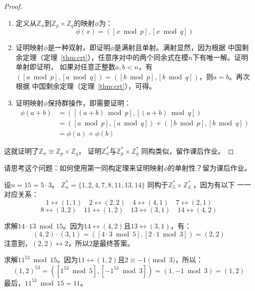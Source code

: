\begin{proof}
\begin{enumerate}
\item 定义从$\mathbb{Z}_n$到$\mathbb{Z}_p \times \mathbb{Z}_q$的映射$\phi$为：
\[\phi(x) = ([x \bmod p], [x \bmod q])\]

\item 证明映射$\phi$是一种双射，即证明$\phi$是满射且单射。满射显然，因为根据
中国剩余定理（定理~\ref{thm:crt}），任意序对中的两个同余式在模$n$下有唯一解。证明单射即证明，
如果对任意正整数$a, b < n$，有
$([a \bmod p], [a \bmod q]) = ([b \bmod p], [b \bmod q])$，则$a = b$。再次根据
中国剩余定理（定理~\ref{thm:crt}），可得。

\item 证明映射$\phi$保持群操作，即需要证明：
\begin{align*}
\phi(a+b) &= ([(a+b) \bmod p], [(a+b)\bmod q]) \\
                     &=  ([a \bmod p], [a \bmod q]) + ([b \bmod p], [b\bmod q])\\
                     &=  \phi(a) + \phi(b)
\end{align*}
\end{enumerate}
这就证明了$\mathbb{Z}_n \cong \mathbb{Z}_p \times \mathbb{Z}_q $，
证明$\mathbb{Z}_n^*$与$\mathbb{Z}_p^* \times \mathbb{Z}_q^*$ 同构类似，留作课后作业。
\end{proof}

\begin{thinking}
请思考这个问题：如何使用第一同构定理来证明映射$\phi$的单射性？留为课后作业。
\end{thinking}
\begin{example}
		设$n = 15 = 5 \cdot 3$。
		$\mathbb{Z}_n^* = \{ 1, 2, 4, 7, 8, 11, 13, 14\}$ 同构于$\mathbb{Z}_5^* \times \mathbb{Z}_3^*$ ，因为有以下
		一一对应关系：
		\[ 1 \leftrightarrow (1, 1) \quad 2 \leftrightarrow(2,2) \quad 4 \leftrightarrow (4,1) \quad 7 \leftrightarrow (2,1)\]
		\[8 \leftrightarrow (3,2) \quad 11\leftrightarrow(1,2) \quad 13 \leftrightarrow (3,1) \quad 14 \leftrightarrow (4,2)\]
\end{example}
\begin{example}
		求解$14\cdot 13 \bmod 15$。因为$14 \leftrightarrow (4,2)$且$13 \leftrightarrow (3,1)$，有：
		\[(4, 2) \cdot (3, 1) = ([4\cdot 3 \bmod 5], [2\cdot 1 \bmod 3]) = (2, 2)\]
		注意到，$(2, 2) \leftrightarrow 2$，所以$2$是最终答案。
\end{example}

\begin{example}
	求解$11^{53} \bmod 15$。因为$11 \leftrightarrow (1,2)$且$2 \equiv -1  \pmod{3}$，所以：
		\[(1, 2)^{53} = ([1^{53} \bmod 5 ], [-1^{53} \bmod 3]) = (1, -1 \bmod 3) = (1, 2)\]
	 最后，$11^{53} \bmod 15 = 11$。
\end{example}

